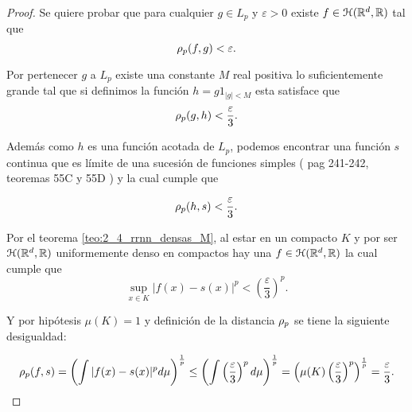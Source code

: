 

\begin{proof}
    Se quiere probar que para cualquier $g \in L_p$ y 
    $\varepsilon >0$ existe $f \in \mathcal{H}(\mathbb{R}^d,\mathbb{R})$ tal que 
    \begin{equation}
        \rho_{p}(f,g) <\varepsilon.
    \end{equation}   
    
    Por pertenecer $g$ a $L_p$ existe una constante $M$ real positiva
    lo suficientemente grande 
    tal que si definimos la función $h =g 1_{|g|<M}$ esta satisface 
    que
    \begin{equation}\label{eq:corolario_2_2:h_compacto}
        \rho_{p}(g,h) < \frac{\varepsilon}{3}.
    \end{equation}
    
    Además como $h$ es una función acotada de $L_p$, podemos encontrar
    una función $s$ continua que es límite de una sucesión de
    funciones simples 
    ( pag 241-242,  teoremas 55C y 55D \cite{nla.cat-vn1819421})
    y la cual cumple que 

    \begin{equation}\label{eq:corolario_2_2:s_continua}
        \rho_{p}(h,s) < \frac{\varepsilon}{3}.
    \end{equation}

    Por el teorema \ref{teo:2_4_rrnn_densas_M}, al estar en un compacto $K$ y por ser $\mathcal{H}(\mathbb{R}^d,\mathbb{R})$ uniformemente
    denso en compactos hay una $f \in \mathcal{H}(\mathbb{R}^d,\mathbb{R})$ la cual cumple que
    \begin{equation}
        \sup_{x \in K} |f(x) -s(x)|^p 
        <
         \left( \frac{\varepsilon}{3}\right) ^p.
    \end{equation}
    
    Y por hipótesis $\mu(K) =1$ y definición de la distancia $\rho_{p}$ 
    se tiene la siguiente desigualdad: 

    \begin{equation} \label{eq:corolario_2_2:cota_rrnn}
        \rho_{p}(f,s) = 
        \left(\int |f(x) - s(x)|^p d\mu \right)^\frac{1}{p}
        \leq 
        \left(\int  \left( \frac{\varepsilon}{3}\right) ^p d\mu \right)^\frac{1}{p}
        = \left( \mu(K)  \left(\frac{\varepsilon}{3} \right)^p\right) ^\frac{1}{p}
        = \frac{\varepsilon}{3}.
    \end{equation}


\end{proof}
